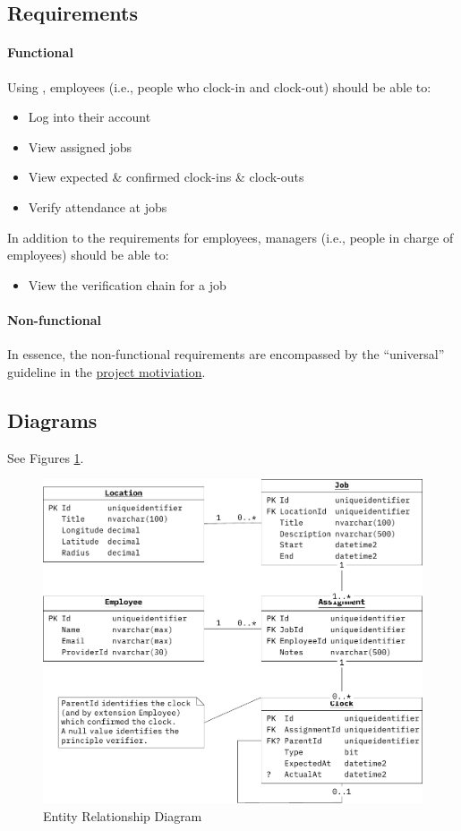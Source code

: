 \subsection{Requirements} \label{ss:requirements}

\paragraph{Functional}
Using \projectname{}, employees (i.e., people who \gls{clock-in} and
\gls{clock-out}) should be able to:

\begin{itemize}
  \item Log into their account
  \item View assigned jobs
  \item View expected \& confirmed clock-ins \&
        clock-outs
  \item Verify attendance at jobs
\end{itemize}

In addition to the requirements for employees, managers
(i.e., people in charge of employees) should be able to:

\begin{itemize}
  \item View the verification chain for a job
\end{itemize}

\paragraph{Non-functional}

In essence, the non-functional requirements are encompassed
by the \enquote{universal} guideline in the
\hyperref[s:motivation]{project motiviation}.

\subsection{Diagrams}

See Figures \ref{fig:erd}.

\begin{figure}[h]
  \centering
  \includegraphics[width=\linewidth]{05 design/assets/entity relationship diagram.pdf}
  \caption{Entity Relationship Diagram}
  \label{fig:erd}
\end{figure}